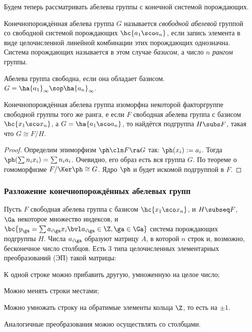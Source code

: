 \documentclass[a4paper]{article}
\begin{document}
Будем теперь рассматривать абелевы группы с конечной системой порождающих.

\begin{df}
Конечнопорождённая абелева группа $G$ называется \emph{свободной абелевой} группой со свободной  системой
порождающих $\hc{a_1 \sco a_n}$, если запись элемента в виде целочисленной линейной комбинации этих
порождающих однозначна. Система порождающих называется в этом случае \emph{базисом}, а число $n$
\emph{рангом} группы.
\end{df}

Абелева группа свободна, если она обладает базисом. $G = \ha{a_1}_\infty \sop \ha{a_n}_\infty$.

\begin{theorem}
Конечнопорождённая абелева группа изоморфна некоторой факторгруппе свободной группы того же ранга, е если
$F$ свободная абелева группа с базисом $\hc{x_1 \sco x_n}$, а $G = \ha{a_1 \sco a_n}$, то
найдётся подгруппа $H \subs F$, такая что $G \cong F/H$.
\end{theorem}
\begin{proof}
Определим эпиморфизм $\ph\cln F \ra G$ так: $\ph(x_i) := a_i$. Тогда $\ph(\sum n_i x_i) = \sum n_i a_i$.
Очевидно, его образ есть вся группа $G$. По теореме о гомоморфизме $F/\Ker \ph \cong G$. Ядро $\ph$  и будет
искомой подгруппой в $F$.
\end{proof}

\subsubsection{Разложение конечнопорождённых абелевых групп}

Пусть $F$ свободная абелева группа с базисом $\hc{x_1 \sco x_n}$, и $H \subseq F$, $\Ga$ некоторое множество
индексов, и $\bc{y_\ga = \sum a_{i\ga} x_i \bvl  a_{i\ga} \in \Z, \ga \in \Ga}$ система порождающих
подгруппы $H$. Числа $a_{i\ga}$ образуют матрицу $A$, в которой $n$ строк и,  возможно, бесконечное число
столбцов. Есть 3 типа целочисленных элементарных преобразований (ЭП) такой матрицы:

 К одной строке можно прибавить другую, умноженную на целое число;

 Можно менять строки местами;

 Можно умножать строку на обратимые элементы кольца $\Z$, то есть на $\pm 1$.

Аналогичные преобразования можно осуществлять со столбцами.
\end{document}
